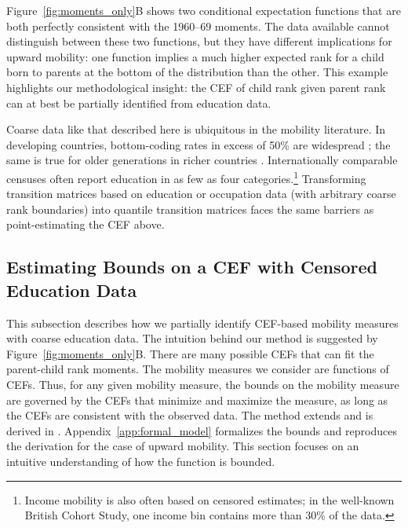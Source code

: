 \documentclass[12pt,letterpaper]{article}
\numberwithin{equation}{section}
\begin{document}
Figure~\ref{fig:moments_only}B shows two conditional expectation functions that are both perfectly consistent with the 1960--69 moments. The data available cannot distinguish between these two functions, but they have different implications for upward mobility: one function implies a much higher expected rank for a child born to parents at the bottom of the distribution than the other. This example highlights our methodological insight: the CEF of child rank given parent rank can at best be partially identified from education data.

Coarse data like that described here is ubiquitous in the mobility literature. In developing countries, bottom-coding rates in excess of 50\% are widespread \cite{narayan2018}; the same is true for older generations in richer countries \cite{long2013}. Internationally comparable censuses often report education in as few as four categories.\footnote{Income mobility is also often based on censored estimates; in the well-known British Cohort Study, one income bin contains more than 30\% of the data.} Transforming transition matrices based on education or occupation data (with arbitrary coarse rank boundaries) into quantile transition matrices faces the same barriers as point-estimating the CEF above.

\subsection{Estimating Bounds on a CEF with Censored Education Data}
\label{ssec:math}

This subsection describes how we partially identify CEF-based mobility measures with coarse education data. The intuition behind our method is suggested by Figure~\ref{fig:moments_only}B. There are many possible CEFs that can fit the parent-child rank moments. The mobility measures we consider are functions of CEFs. Thus, for any given mobility measure, the bounds on the mobility measure are governed by the CEFs that minimize and maximize the measure, as long as the CEFs are consistent with the observed data. The method extends  and is derived in . Appendix~\ref{app:formal_model} formalizes the bounds and reproduces the derivation for the case of upward mobility. This section focuses on an intuitive understanding of how the function is bounded.
\end{document}
